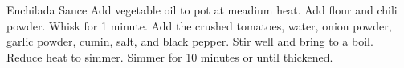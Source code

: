 \documentclass[../cookbook.tex]{subfiles}
\begin{document}
\begin{recipe}{Enchilada Sauce}{}{}
    Add vegetable oil to pot at meadium heat.
    Add flour and chili powder. Whisk for 1 minute.
    Add the crushed tomatoes, water, onion powder, garlic powder, cumin, salt,
    and black pepper. Stir well and bring to a boil. Reduce heat to simmer.
    Simmer for 10 minutes or until thickened.

\end{recipe}
\end{document}
